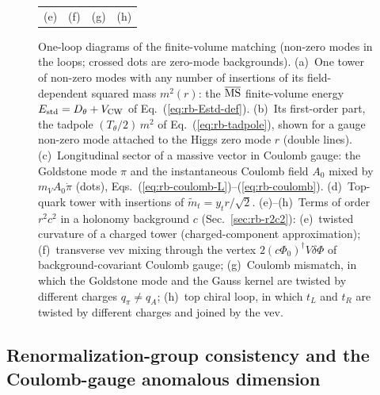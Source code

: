 \begin{figure}[t]
\begin{tabular}{cccc}
\\[2pt]
(e) & (f) & (g) & (h)
\end{tabular}
\caption{One-loop diagrams of the finite-volume matching (non-zero modes in the loops; crossed dots are zero-mode backgrounds).
(a)~One tower of non-zero modes with any number of insertions of its field-dependent squared mass $m^2(r)$: the $\overline{\mathrm{MS}}$ finite-volume energy $E_{\rm std}=D_\theta+V_{\rm CW}$ of Eq.~(\ref{eq:rb-Estd-def}).
(b)~Its first-order part, the tadpole $(T_\theta/2)\,m^2$ of Eq.~(\ref{eq:rb-tadpole}), shown for a gauge non-zero mode attached to the Higgs zero mode $r$ (double lines).
(c)~Longitudinal sector of a massive vector in Coulomb gauge: the Goldstone mode $\pi$ and the instantaneous Coulomb field $A_0$ mixed by $m_VA_0\dot\pi$ (dots), Eqs.~(\ref{eq:rb-coulomb-L})--(\ref{eq:rb-coulomb}).
(d)~Top-quark tower with insertions of $\tilde m_t=y_tr/\sqrt2$.
(e)--(h)~Terms of order $r^2c^2$ in a holonomy background $c$ (Sec.~\ref{sec:rb-r2c2}): (e)~twisted curvature of a charged tower (charged-component approximation); (f)~transverse vev mixing through the vertex $2(c\Phi_0)^\dagger V\delta\Phi$ of background-covariant Coulomb gauge; (g)~Coulomb mismatch, in which the Goldstone mode and the Gauss kernel are twisted by different charges $q_\pi\neq q_A$; (h)~top chiral loop, in which $t_L$ and $t_R$ are twisted by different charges and joined by the vev.}
\label{fig:rb-diagrams}
\end{figure}

\subsection{Renormalization-group consistency and the Coulomb-gauge anomalous dimension}
\label{sec:rb-rg}

